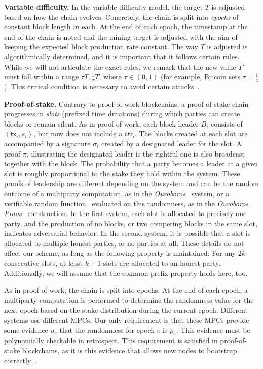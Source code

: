 \noindent
\textbf{Variable difficulty.}
In the variable difficulty model, the target $T$ is adjusted based on how the chain evolves.
Concretely, the chain is split into \emph{epochs} of constant block length $m$ each. At the end of each
epoch, the timestamp at the end of the chain is noted and the mining target is adjusted with the
aim of keeping the expected block production rate constant.
The
way $T$ is adjusted is algorithmically determined, and it is important that it follows certain
rules. While we will not articulate the exact rules, we remark that the new value $T'$ must fall
within a range $\tau T, \frac{1}{\tau} T$, where $\tau \in (0, 1)$ (for example, Bitcoin sets
$\tau = \frac{1}{4}$). This critical condition is necessary to avoid certain attacks~\cite{bahack}.

\noindent
\textbf{Proof-of-stake.}
Contrary to proof-of-work blockchains, a proof-of-stake chain progresses in \emph{slots}
(prefixed time durations) during which
parties can create blocks or remain silent.
As in proof-of-work, each block header $B_i$ consists of $\left<\textsf{tx}_i, s_i\right>$, but now
does not include a $\textsf{ctr}_i$.
The blocks created at each slot are accompanied by a
signature $\sigma_i$ created by a designated leader for the slot.
A proof $\pi_i$ illustrating the designated leader is the rightful one
is also broadcast together with the block.
The probability that a party becomes a leader at a given slot is roughly
proportional to the stake they hold within the system.
These proofs of leadership are different depending on the system and can
be the random outcome of a multiparty computation, as in the \emph{Ouroboros}~\cite{ouroboros} system,
or a verifiable random function~\cite{FOCS:MicRabVad99} evaluated on this randomness, as in
the \emph{Ouroboros Praos}~\cite{praos} construction.
In the first system,
each slot is allocated to precisely one party, and the production of no blocks, or two competing blocks in the
same slot, indicates adversarial behavior. In the second system, it is possible that a slot is allocated
to multiple honest parties, or no parties at all. These details do not affect our scheme, as long as the following
property is maintained: For any $2k$ consecutive slots, at least $k+1$ slots are allocated to an honest
party. Additionally, we will assume that the common prefix property holds here, too.

As in proof-of-work, the chain is split into epochs.
At the end of each epoch, a multiparty computation is performed to determine
the randomness value for the next epoch based on the stake distribution during the current epoch.
Different systems use different MPCs. Our only requirement is that these MPCs provide some
evidence $u_e$ that the randomness for epoch $e$ is $\rho_e$. This evidence must be
polynomially checkable in retrospect. This requirement is satisfied in proof-of-stake blockchains,
as it is this evidence that allows new nodes to bootstrap correctly~\cite{ouroboros-genesis}.
